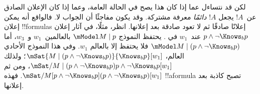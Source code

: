 \documentclass[../../../include/open-logic-section]{subfiles}
\begin{document}
لكن قد نتساءل عما إذا كان هذا يصح في الحالة العامة، وعما إذا كان
الإعلان الصادق عن~$!A$ يجعل $!A$ \emph{دائمًا} معرفة مشتركة. وقد يكون
مفاجئًا أن الجواب لا. فالواقع أنه يمكن إعلان !!{formula}s إعلانًا
صادقًا ثم لا تعود صادقة بعد إعلانها. انظر، مثلًا، في آثار إعلان
$p \land \lnot \Knows_b p$ عند~$w_1$ في
. يحتفظ النموذج $\mModel M \mid p$
بالعالمين~$w_1$ و~$w_3$، أما
$\mModel M \mid (p \land \lnot \Knows_b p)$ فلا يحتفظ إلا بالعالم
$w_1$. وفي هذا النموذج الأحادي العالم،
$\mSat{M \mid (p \land \lnot \Knows_b p)}{\Knows_b p}[w_1]$؛ ولذلك
$\mSat/{M \mid (p \land \lnot \Knows_b p)}{p \land \lnot \Knows_b p}[w_1]$،
ومن ثم
$\mSat/{M}{[p \land \lnot \Knows_b p](p \land \lnot \Knows_b p)}[w_1]$.
فهذه !!a{formula} تصبح كاذبة بعد إعلانها.
\end{document}
